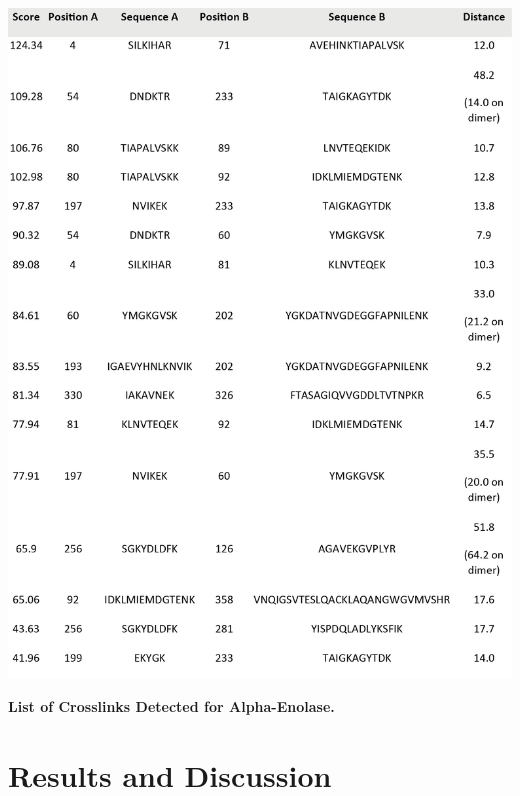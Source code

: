 \begin{table}[!htb]
  \center
  \includegraphics[]{Chapter.2/Figures/t1.png}
  \captionsetup{singlelinecheck = false, format= hang}
  \caption{
    \textbf{List of Crosslinks Detected for Alpha-Enolase.}\\
  }
  \label{tab:tab2.1}
\end{table}

\section{Results and Discussion}

